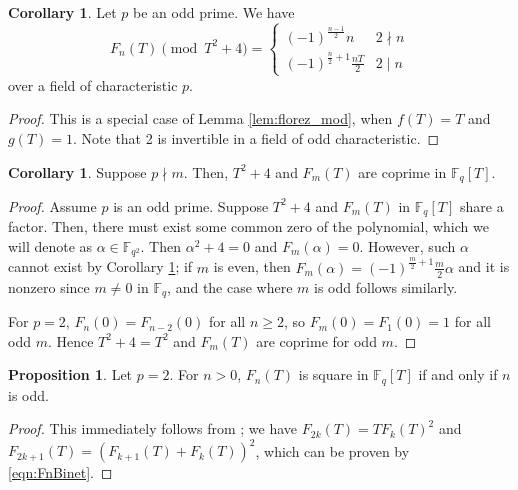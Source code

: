 \documentclass[letterpaper, 10pt]{article}
\newcommand{\bF}{\mathbb{F}}
\newcommand{\1}{\mathds{1}}	%
\theoremstyle{definition}
\newtheorem{proposition}[theorem]{Proposition}
\newtheorem{corollary}[theorem]{Corollary}
\theoremstyle{remark}
\begin{document}
\begin{corollary}\label{cor:alpha}
    Let $p$ be an odd prime. We have
    \begin{equation}
        \label{eqn:Fnalpha}
        F_n(T) \pmod{T^2 + 4} = \begin{cases}
            (-1)^{\frac{n-1}{2}}n & 2 \nmid n \\
            (-1)^{\frac{n}{2} + 1} \frac{nT}{2} & 2 \mid n
        \end{cases}
    \end{equation}
    over a field of characteristic $p$.
\end{corollary}
\begin{proof}
    This is a special case of Lemma \ref{lem:florez_mod}, when $f(T) = T$ and $g(T) = 1$.
    Note that 2 is invertible in a field of odd characteristic.
\end{proof}

\begin{corollary}\label{cor:coprime}
     Suppose $p \nmid m$. Then, $T^2 + 4$ and $F_m(T)$ are coprime in $\mathbb{F}_q[T]$.
\end{corollary}
\begin{proof}
    Assume $p$ is an odd prime.
    Suppose $T^2 + 4$ and $F_m(T)$ in $\mathbb{F}_q[T]$ share a factor. Then, there must exist some common zero of the polynomial, which we will denote as $\alpha \in \bF_{q^2}$.
    Then \(\alpha^2 + 4 = 0\) and \(F_m(\alpha) = 0\).
    However, such \(\alpha\) cannot exist by Corollary \ref{cor:alpha}; if \(m\) is even, then \(F_m(\alpha) = (-1)^{\frac{m}{2}+1} \frac{m}{2} \alpha\) and it is nonzero since \(m \ne 0\) in \(\bF_q\), and the case where \(m\) is odd follows similarly.

    For \(p = 2\), \(F_{n}(0) = F_{n-2}(0)\) for all \(n \ge 2\), so \(F_m(0) = F_1(0) = 1\) for all odd \(m\). Hence \(T^2 + 4 = T^2\) and \(F_m(T)\) are coprime for odd \(m\).
\end{proof}

\begin{proposition}
    \label{prop:Fmp2sq}
    Let \(p = 2\). For $n > 0$, \(F_n(T)\) is square in \(\bF_q[T]\) if and only if \(n\) is odd.
\end{proposition}
\begin{proof}
    This immediately follows from \cite[Lemma 3.5]{kitayama2017irreducibility}; we have \(F_{2k}(T) = T F_k(T)^2\) and \(F_{2k+1}(T) = (F_{k+1}(T) + F_k(T))^2\), which can be proven by \eqref{eqn:FnBinet}.
\end{proof}
\end{document}
